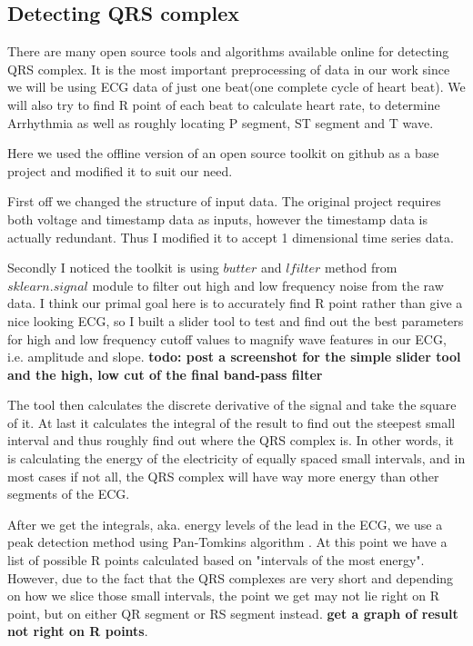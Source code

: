 \documentclass[runningheads]{llncs}
\begin{document}
\subsection{Detecting QRS complex}
There are many open source tools and algorithms available online for detecting QRS complex. It is the most important preprocessing of data in our work since we will be using ECG data of just one beat(one complete cycle of heart beat). We will also try to find R point of each beat to calculate heart rate, to determine Arrhythmia as well as roughly locating P segment, ST segment and T wave. 

Here we used the offline version of an open source toolkit on github \cite{Sznajder} as a base project and modified it to suit our need. 

First off we changed the structure of input data. The original project requires both voltage and timestamp data as inputs, however the timestamp data is actually redundant. Thus I modified it to accept 1 dimensional time series data.

Secondly I noticed the toolkit is using $butter$ and $lfilter$ method from $sklearn.signal$ module to filter out high and low frequency noise from the raw data. I think our primal goal here is to accurately find R point rather than give a nice looking ECG, so I built a slider tool to test and find out the best parameters for high and low frequency cutoff values to magnify wave features in our ECG, i.e. amplitude and slope. \textbf{todo: post a screenshot for the simple slider tool and the high, low cut of the final band-pass filter}

The tool then calculates the discrete derivative of the signal and take the square of it. At last it calculates the integral of the result to find out the steepest small interval and thus roughly find out where the QRS complex is. In other words, it is calculating the energy of the electricity of equally spaced small intervals, and in most cases if not all, the QRS complex will have way more energy than other segments of the ECG. 

After we get the integrals, aka. energy levels of the lead in the ECG, we use a peak detection method \cite{Slavic} using Pan-Tomkins algorithm \cite{Sznajder}. At this point we have a list of possible R points calculated based on "intervals of the most energy". However, due to the fact that the QRS complexes are very short and depending on how we slice those small intervals, the point we get may not lie right on R point, but on either QR segment or RS segment instead. \textbf{get a graph of result not right on R points}. 
\end{document}

